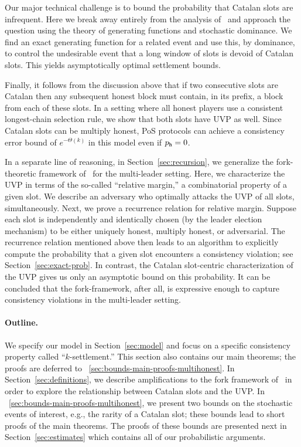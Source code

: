 Our major technical challenge is to bound the probability that Catalan
slots are infrequent. Here we break away entirely from the analysis
of~\cite{SnowWhite} and approach the question using the theory of
generating functions and stochastic dominance. We find an exact
generating function for a related event and use this, by dominance, to
control the undesirable event that a long window of slots is devoid of
Catalan slots. This yields
asymptotically optimal settlement bounds.

Finally, it follows from the discussion above that if two consecutive
slots are Catalan then any subsequent honest block must contain, in
its prefix, a block from each of these slots.  In a setting where all
honest players use a consistent longest-chain selection rule,
we show that both slots have UVP as well.  Since Catalan slots can be
multiply honest, PoS protocols can achieve a consistency error bound
of $e^{-\Theta(k)}$ in this model even if $p_{\mathtt{h}} = 0$.

In a separate line of reasoning, in Section~\ref{sec:recursion}, 
we generalize the fork-theoretic framework of~\citet{LinearConsistency} for the multi-leader setting. 
Here, we characterize the UVP 
in terms of the so-called ``relative margin,'' 
a combinatorial property of a given slot. 
We describe an adversary who optimally attacks the UVP 
of all slots, simultaneously. 
Next, we prove a recurrence relation for relative margin. 
Suppose each slot is 
independently and identically chosen 
(by the leader election mechanism) 
to be either uniquely honest, multiply honest, or adversarial. 
The recurrence relation mentioned above then 
leads to an algorithm to explicitly compute 
the probability that 
a given slot encounters a consistency violation; 
see Section~\ref{sec:exact-prob}. 
In contrast, the Catalan slot-centric characterization of the UVP 
gives us only an asymptotic bound on this probability. 
It can be concluded that the fork-framework, after all, 
is expressive enough to capture consistency violations 
in the multi-leader setting.


\paragraph{Outline.}
We specify our model in Section~\ref{sec:model} and focus on a
specific consistency property called ``$k$-settlement.''  This section
also contains our main theorems; the proofs are deferred to
\Section~\ref{sec:bounds-main-proofs-multihonest}.  In
Section~\ref{sec:definitions}, we describe amplifications
to the fork framework of~\cite{LinearConsistency} in order to
explore the relationship between Catalan slots and the UVP. 
In \Section~\ref{sec:bounds-main-proofs-multihonest},
we present two bounds on the stochastic events of interest, e.g., the
rarity of a Catalan slot; these bounds lead to short proofs of the
main theorems.  The proofs of these bounds are presented next in
Section~\ref{sec:estimates} which contains all of our probabilistic
arguments.  

